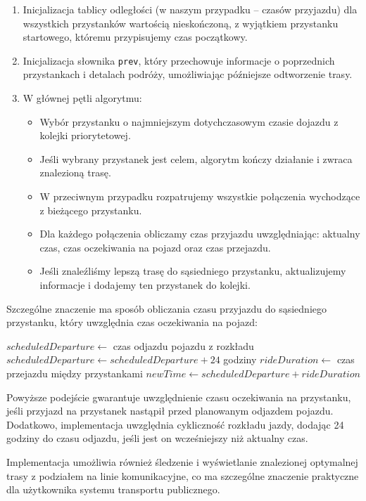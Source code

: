 \documentclass[12pt,a4paper]{article}
\begin{document}
\begin{enumerate}
    \item Inicjalizacja tablicy odległości (w naszym przypadku -- czasów przyjazdu) dla wszystkich przystanków wartością nieskończoną, z wyjątkiem przystanku startowego, któremu przypisujemy czas początkowy.
    \item Inicjalizacja słownika \texttt{prev}, który przechowuje informacje o poprzednich przystankach i detalach podróży, umożliwiając późniejsze odtworzenie trasy.
    \item W głównej pętli algorytmu:
    \begin{itemize}
        \item Wybór przystanku o najmniejszym dotychczasowym czasie dojazdu z kolejki priorytetowej.
        \item Jeśli wybrany przystanek jest celem, algorytm kończy działanie i zwraca znalezioną trasę.
        \item W przeciwnym przypadku rozpatrujemy wszystkie połączenia wychodzące z bieżącego przystanku.
        \item Dla każdego połączenia obliczamy czas przyjazdu uwzględniając: aktualny czas, czas oczekiwania na pojazd oraz czas przejazdu.
        \item Jeśli znaleźliśmy lepszą trasę do sąsiedniego przystanku, aktualizujemy informacje i dodajemy ten przystanek do kolejki.
    \end{itemize}
\end{enumerate}

Szczególne znaczenie ma sposób obliczania czasu przyjazdu do sąsiedniego przystanku, który uwzględnia czas oczekiwania na pojazd:

\begin{algorithmic}
\STATE $scheduledDeparture \gets$ czas odjazdu pojazdu z rozkładu
    \STATE $scheduledDeparture \gets scheduledDeparture + 24$ godziny
\ENDIF
\STATE $rideDuration \gets$ czas przejazdu między przystankami
\STATE $newTime \gets scheduledDeparture + rideDuration$
\end{algorithmic}

Powyższe podejście gwarantuje uwzględnienie czasu oczekiwania na przystanku, jeśli przyjazd na przystanek nastąpił przed planowanym odjazdem pojazdu. Dodatkowo, implementacja uwzględnia cykliczność rozkładu jazdy, dodając 24 godziny do czasu odjazdu, jeśli jest on wcześniejszy niż aktualny czas.

Implementacja umożliwia również śledzenie i wyświetlanie znalezionej optymalnej trasy z podziałem na linie komunikacyjne, co ma szczególne znaczenie praktyczne dla użytkownika systemu transportu publicznego.
\end{document}
